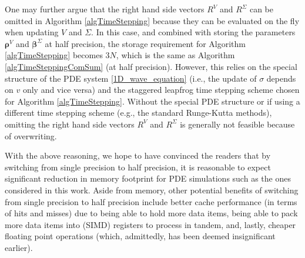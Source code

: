 \documentclass[10pt]{article}
\begin{document}
One may further argue that the right hand side vectors $R^V$ and $R^\Sigma$ can be omitted in Algorithm \ref{algTimeStepping} because they can be evaluated on the fly when updating $V$ and $\Sigma$. 
%
In this case, and combined with storing the parameters $\boldsymbol \rho^V$ and $\boldsymbol \beta^\Sigma$ at half precision, the storage requirement for Algorithm \ref{algTimeStepping} becomes $3N$, which is the same as Algorithm \ref{algTimeSteppingComSum} (at half precision).
%
However, this relies on the special structure of the PDE system \eqref{1D_wave_equation} (i.e., the update of $\sigma$ depends on $v$ only and vice versa) and the staggered leapfrog time stepping scheme chosen for Algorithm \ref{algTimeStepping}.
%
Without the special PDE structure or if using a different time stepping scheme (e.g., the standard Runge-Kutta methods), omitting the right hand side vectors $R^V$ and $R^\Sigma$ is generally not feasible because of overwriting.%
\footnotemark
{}

With the above reasoning, we hope to have convinced the readers that by switching from single precision to half precision, it is reasonable to expect significant reduction in memory footprint for PDE simulations such as the ones considered in this work.
% 
Aside from memory, other potential benefits of switching from single precision to half precision include better cache performance (in terms of hits and misses) due to being able to hold more data items, 
% 
being able to pack more data items into (SIMD) registers to process in tandem, %
%
and, lastly, cheaper floating point operations (which, admittedly, has been deemed insignificant earlier).
\end{document}
